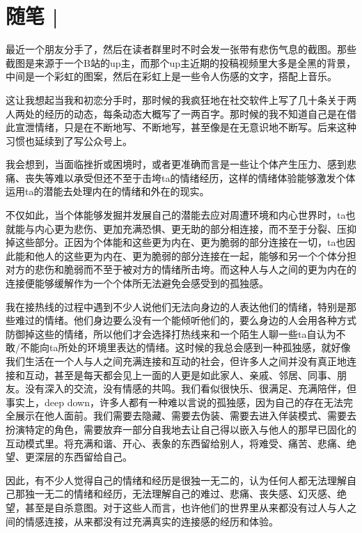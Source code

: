 \chapter{随笔 |}





最近一个朋友分手了，然后在读者群里时不时会发一张带有悲伤气息的截图。那些截图是来源于一个B站的up主，而那个up主近期的投稿视频里大多是全黑的背景，中间是一个彩虹的图案，然后在彩虹上是一些令人伤感的文字，搭配上音乐。

这让我想起当我和初恋分手时，那时候的我疯狂地在社交软件上写了几十条关于两人两处的经历的动态，每条动态大概写了一两百字。那时候的我不知道自己是在借此宣泄情绪，只是在不断地写、不断地写，甚至像是在无意识地不断写。后来这种习惯也延续到了写公众号上。

我会想到，当面临挫折或困境时，或者更准确而言是一些让个体产生压力、感到悲痛、丧失等难以承受但还不至于击垮ta的情绪经历，这样的情绪体验能够激发个体运用ta的潜能去处理内在的情绪和外在的现实。

不仅如此，当个体能够发掘并发展自己的潜能去应对周遭环境和内心世界时，ta也就能与内心更为悲伤、更加充满恐惧、更无助的部分相连接，而不至于分裂、压抑掉这些部分。正因为个体能和这些更为内在、更为脆弱的部分连接在一切，ta也因此能和他人的这些更为内在、更为脆弱的部分连接在一起，能够和另一个个体分担对方的悲伤和脆弱而不至于被对方的情绪所击垮。而这种人与人之间的更为内在的连接便能够缓解作为一个个体所无法避免会感受到的孤独感。

我在接热线的过程中遇到不少人说他们无法向身边的人表达他们的情绪，特别是那些难过的情绪。他们身边要么没有一个能倾听他们的，要么身边的人会用各种方式防御掉这些的情绪，所以他们才会选择打热线来和一个陌生人聊一些ta自认为不敢/不能向ta所处的环境里表达的情绪。这时候的我总会感到一种孤独感，就好像我们生活在一个人与人之间充满连接和互动的社会，但许多人之间并没有真正地连接和互动，甚至是每天都会见上一面的人更是如此\pozhehao{}家人、亲戚、邻居、同事、朋友。没有深入的交流，没有情感的共鸣。我们看似很快乐、很满足、充满陪伴，但事实上，deep down，许多人都有一种难以言说的孤独感，因为自己的存在无法完全展示在他人面前。我们需要去隐藏、需要去伪装、需要去进入佯装模式、需要去扮演特定的角色，需要放弃一部分自我地去让自己得以嵌入与他人的那早已固化的互动模式里。将充满和谐、开心、表象的东西留给别人，将难受、痛苦、悲痛、绝望、更深层的东西留给自己。

因此，有不少人觉得自己的情绪和经历是很独一无二的，认为任何人都无法理解自己那独一无二的情绪和经历，无法理解自己的难过、悲痛、丧失感、幻灭感、绝望，甚至是自杀意图。对于这些人而言，也许他们的世界里从来都没有过人与人之间的情感连接，从来都没有过充满真实的连接感的经历和体验。

